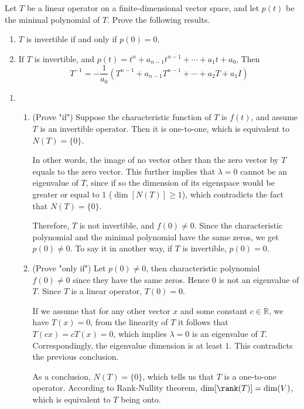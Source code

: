 \begin{homeworkProblem}

  Let $T$ be a linear operator on a finite-dimensional vector space, and let $p(t)$ be the minimal polynomial of $T$. Prove the following results.
\begin{enumerate}
  \item $T$ is invertible if and only if $p(0) = 0$.
  \item If $T$ is invertible, and $p(t) = t^n + a_{n-1}t^{n-1} + \cdots + a_1t + a_0$, Then
  \[ T^{-1} = -\frac{1}{a_0}(T^{n-1}+a_{n-1}T^{n-1}+\cdots+a_2T + a_1I)\]
\end{enumerate}

\solution

\begin{enumerate}
  \item \begin{enumerate}
    \item (Prove "if") Suppose the characteristic function of $T$ is $f(t)$, and assume $T$ is an invertible operator. Then it is one-to-one, which is equivalent to $N(T) = \{ 0 \}$.

  In other words, the image of no vector other than the zero vector by $T$ equals to the zero vector. This further implies that $\lambda = 0$ cannot be an eigenvalue of $T$, since if so the dimension of its eigenspace would be greater or equal to $1$ ($\dim[N(T)] \geq 1$), which contradicts the fact that $N(T) = \{ 0 \}$.

  Therefore, $T$ is not invertible, and $f(0) \neq 0$. Since the characteristic polynomial and the minimal polynomial have the same zeros, we get $p(0) \neq 0$. To say it in another way, if $T$ is invertible, $p(0) = 0$.
  \item (Prove "only if") Let $p(0) \neq 0$, then characteristic polynomial $f(0) \neq 0$ since they have the same zeros. Hence $0$ is not an eigenvalue of $T$. Since $T$ is a linear operator, $T(0) = 0$.

  If we assume that for any other vector $x$ and some constant $c \in \mathbb{R}$, we have $T(x) = 0$, from the linearity of $T$ it follows that $T(cx) = cT(x) = 0$, which implies $\lambda = 0$ is an eigenvalue of $T$. Correspondingly, the eigenvalue dimension is at least $1$. This contradicts the previous conclusion.

  As a conclusion, $N(T) = \{ 0 \}$, which tells us that $T$ is a one-to-one operator. According to Rank-Nullity theorem, $\dim[\rank(T)] = \dim(V)$, which is equivalent to $T$ being onto.


\end{enumerate}
\end{enumerate}
\end{homeworkProblem}
